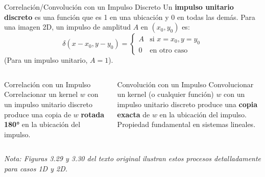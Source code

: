 \documentclass[10pt]{beamer}
\newcommand{\eqnum}[1]{\tag{#1}} %
\begin{document}
\begin{frame}[fragile]{Correlación/Convolución con un Impulso Discreto}
Un \textbf{impulso unitario discreto} es una función que es 1 en una ubicación y 0 en todas las demás.
Para una imagen 2D, un impulso de amplitud $A$ en $(x_0, y_0)$ es:
\begin{equation}
\delta(x-x_0, y-y_0) = \begin{cases} A & \text{si } x=x_0, y=y_0 \\ 0 & \text{en otro caso} \end{cases} \eqnum{3-33}
\end{equation}
(Para un impulso unitario, $A=1$).
\vspace{0.1cm}
\begin{columns}[T]
\begin{column}{0.5\textwidth}
\begin{block}{\footnotesize Correlación con un Impulso}
{\footnotesize Correlacionar un kernel $w$ con un impulso unitario discreto produce una copia de $w$ \textbf{rotada 180°} en la ubicación del impulso.}
\end{block}
\end{column}
\begin{column}{0.5\textwidth}
\begin{alertblock}{\footnotesize Convolución con un Impulso}
{\footnotesize Convolucionar un kernel (o cualquier función) $w$ con un impulso unitario discreto produce una \textbf{copia exacta} de $w$ en la ubicación del impulso. Propiedad fundamental en sistemas lineales.}
\end{alertblock}
\end{column}
\end{columns}
\vspace{0.1cm}
\textit{\tiny Nota: Figuras 3.29 y 3.30 del texto original ilustran estos procesos detalladamente para casos 1D y 2D.}
\end{frame}
\end{document}
